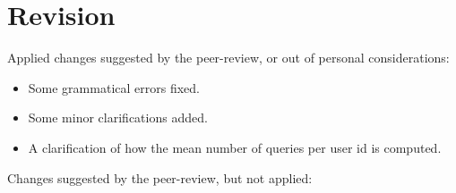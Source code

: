 
\section{Revision}

Applied changes suggested by the peer-review, or out of personal
considerations:

\begin{itemize}

\item Some grammatical errors fixed.

\item Some minor clarifications added.

\item A clarification of how the mean number of queries per user id is
computed.

\end{itemize}

Changes suggested by the peer-review, but not applied:

